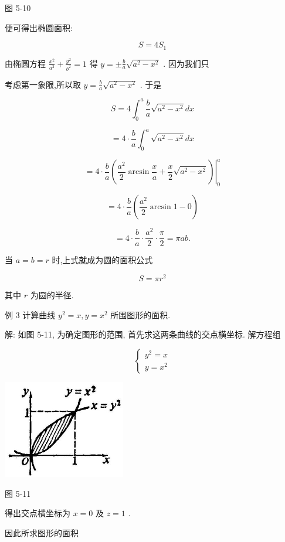 \documentclass[lang=cn,newtx,10pt,scheme=chinese]{elegantbook}
\begin{document}
图 5-10

便可得出椭圆面积:

\[
S = 4{S}_{1}
\]

由椭圆方程 \(\frac{{x}^{2}}{{a}^{2}} + \frac{{y}^{2}}{{b}^{2}} = 1\) 得 \(y = \pm \frac{b}{a}\sqrt{{a}^{2} - {x}^{2}}\) . 因为我们只

考虑第一象限,所以取 \(y = \frac{b}{a}\sqrt{{a}^{2} - {x}^{2}}\) . 于是

\[
S = 4{\int }_{0}^{a}\frac{b}{a}\sqrt{{a}^{2} - {x}^{2}}{dx}
\]

\[
= 4 \cdot \frac{b}{a}{\int }_{0}^{a}\sqrt{{a}^{2} - {x}^{2}}{dx}
\]

\[
= {\left. 4 \cdot \frac{b}{a}\left( \frac{{a}^{2}}{2}\arcsin \frac{x}{a} + \frac{x}{2}\sqrt{{a}^{2} - {x}^{2}}\right) \right| }_{0}^{a}
\]

\[
= 4 \cdot \frac{b}{a}\left( {\frac{{a}^{2}}{2}\arcsin 1 - 0}\right)
\]

\[
= 4 \cdot \frac{b}{a} \cdot \frac{{a}^{2}}{2} \cdot \frac{\pi }{2} = {\pi ab}.
\]

当 \(a = b = r\) 时,上式就成为圆的面积公式

\[
S = \pi {r}^{2}
\]

其中 \(r\) 为圆的半径.

例 3 计算曲线 \({y}^{2} = x,y = {x}^{2}\) 所围图形的面积.

解: 如图 5-11, 为确定图形的范围, 首先求这两条曲线的交点横坐标. 解方程组

\[
\left\{ \begin{array}{l} {y}^{2} = x \\ y = {x}^{2} \end{array}\right.
\]

\begin{center}
\includegraphics[max width=0.4\textwidth]{images/01912c18-5c3f-733d-b775-749ba9897a9d_234_594804.jpg}
\end{center}

图 5-11

得出交点横坐标为 \(x = 0\) 及 \(z = 1\) .

因此所求图形的面积
\end{document}
